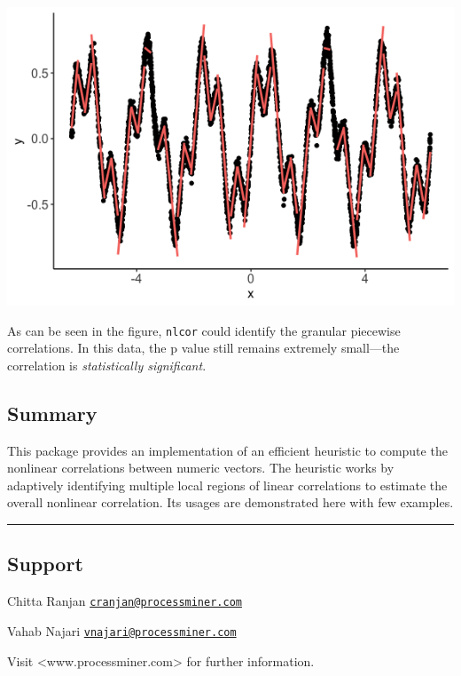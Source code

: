 \documentclass[]{article}
\begin{document}
\begin{center}\includegraphics{README_files/figure-markdown_strict/Figure-3.3-1} \end{center}

As can be seen in the figure, \texttt{nlcor} could identify the granular
piecewise correlations. In this data, the p value still remains
extremely small---the correlation is \emph{statistically significant}.

\hypertarget{summary}{%
\subsection{Summary}\label{summary}}

This package provides an implementation of an efficient heuristic to
compute the nonlinear correlations between numeric vectors. The
heuristic works by adaptively identifying multiple local regions of
linear correlations to estimate the overall nonlinear correlation. Its
usages are demonstrated here with few examples.

\begin{center}\rule{0.5\linewidth}{\linethickness}\end{center}

\hypertarget{support}{%
\subsection{Support}\label{support}}

Chitta Ranjan
\href{mailto:cranjan@processminer.com}{\nolinkurl{cranjan@processminer.com}}

Vahab Najari
\href{mailto:vnajari@processminer.com}{\nolinkurl{vnajari@processminer.com}}

Visit \textless{}www.processminer.com\textgreater{} for further
information.
\end{document}

